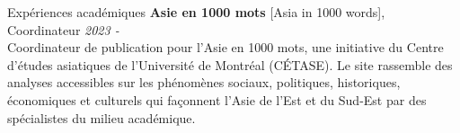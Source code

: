 \documentclass{resume} %
\begin{document}
\begin{rSection}{Expériences académiques}
{\bf Asie en 1000 mots}{ [Asia in 1000 words], Coordinateur} \hfill {\em 2023 - }\\
Coordinateur de publication pour l'Asie en 1000 mots, une initiative du Centre d'études asiatiques de l'Université de Montréal (CÉTASE). Le site rassemble des analyses accessibles sur les phénomènes sociaux, politiques, historiques, économiques et culturels qui façonnent l'Asie de l'Est et du Sud-Est par des spécialistes du milieu académique. 

\clearpage


\end{rSection}
\end{document}
